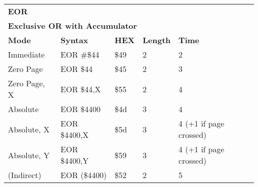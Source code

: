 \begin{table}[H]
\begin{tabular}{p{}p{}p{}p{}p{}}
\multicolumn{5}{p{0.22\textwidth}}{\huge\textbf{EOR}}\\
\multicolumn{5}{p{0.9\textwidth}}{\textbf{Exclusive OR with Accumulator}}\\ \hline
\multicolumn{1}{|p{0.22\textwidth}|}{\textbf{Mode}}&\multicolumn{1}{|p{0.2\textwidth}|}{\textbf{Syntax}}&\multicolumn{1}{|p{0.1\textwidth}|}{\textbf{HEX}}&\multicolumn{1}{|p{0.1\textwidth}|}{\textbf{Length}}&\multicolumn{1}{|p{0.4\textwidth}|}{\textbf{Time}}\\ \hline
\multicolumn{1}{|p{0.22\textwidth}|}{Immediate}&\multicolumn{1}{|p{0.2\textwidth}|}{EOR \#\$44}&\multicolumn{1}{|p{0.1\textwidth}|}{\$49}&\multicolumn{1}{|p{0.1\textwidth}|}{2}&\multicolumn{1}{|p{0.4\textwidth}|}{2}\\ \hline
\multicolumn{1}{|p{0.22\textwidth}|}{Zero Page}&\multicolumn{1}{|p{0.2\textwidth}|}{EOR \$44}&\multicolumn{1}{|p{0.1\textwidth}|}{\$45}&\multicolumn{1}{|p{0.1\textwidth}|}{2}&\multicolumn{1}{|p{0.4\textwidth}|}{3}\\ \hline
\multicolumn{1}{|p{0.22\textwidth}|}{Zero Page, X}&\multicolumn{1}{|p{0.2\textwidth}|}{EOR \$44,X}&\multicolumn{1}{|p{0.1\textwidth}|}{\$55}&\multicolumn{1}{|p{0.1\textwidth}|}{2}&\multicolumn{1}{|p{0.4\textwidth}|}{4}\\ \hline
\multicolumn{1}{|p{0.22\textwidth}|}{Absolute}&\multicolumn{1}{|p{0.2\textwidth}|}{EOR \$4400}&\multicolumn{1}{|p{0.1\textwidth}|}{\$4d}&\multicolumn{1}{|p{0.1\textwidth}|}{3}&\multicolumn{1}{|p{0.4\textwidth}|}{4}\\ \hline
\multicolumn{1}{|p{0.22\textwidth}|}{Absolute, X}&\multicolumn{1}{|p{0.2\textwidth}|}{EOR \$4400,X}&\multicolumn{1}{|p{0.1\textwidth}|}{\$5d}&\multicolumn{1}{|p{0.1\textwidth}|}{3}&\multicolumn{1}{|p{0.4\textwidth}|}{4 (+1 if page crossed)}\\ \hline
\multicolumn{1}{|p{0.22\textwidth}|}{Absolute, Y}&\multicolumn{1}{|p{0.2\textwidth}|}{EOR \$4400,Y}&\multicolumn{1}{|p{0.1\textwidth}|}{\$59}&\multicolumn{1}{|p{0.1\textwidth}|}{3}&\multicolumn{1}{|p{0.4\textwidth}|}{4 (+1 if page crossed)}\\ \hline
\multicolumn{1}{|p{0.22\textwidth}|}{(Indirect)}&\multicolumn{1}{|p{0.2\textwidth}|}{EOR (\$4400)}&\multicolumn{1}{|p{0.1\textwidth}|}{\$52}&\multicolumn{1}{|p{0.1\textwidth}|}{2}&\multicolumn{1}{|p{0.4\textwidth}|}{5}\\ \hline

\end{tabular}
\end{table}
